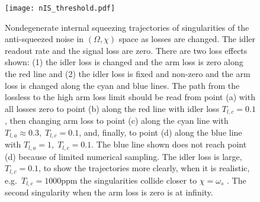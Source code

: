 \begin{figure}
    \centering
    \texttt{[image: nIS\_threshold.pdf]}
    \caption{ Nondegenerate internal squeezing trajectories of singularities of the anti-squeezed noise in $(\Omega, \chi)$ space as losses are changed. The idler readout rate and the signal loss are zero. There are two loss effects shown: (1) the idler loss is changed and the arm loss is zero along the red line and (2) the idler loss is fixed and non-zero and the arm loss is changed along the cyan and blue lines. 
    The path from the lossless to the high arm loss limit should be read from point (a) with all losses zero to point (b) along the red line with idler loss $T_{l,c}=0.1$, then changing arm loss to point (c) along the cyan line with $T_{l,a}\approx0.3,\;T_{l,c}=0.1$, and, finally, to point (d) along the blue line with $T_{l,a}=1,\;T_{l,c}=0.1$. The blue line shown does not reach point (d) because of limited numerical sampling.
    The idler loss is large, $T_{l,c}=0.1$, to show the trajectories more clearly, when it is realistic, e.g.\ $T_{l,c}=1000\text{ppm}$ the singularities collide closer to $\chi=\omega_s$ . The second singularity when the arm loss is zero is at infinity. }
    \label{fig:nIS_threshold_traj}
\end{figure}

